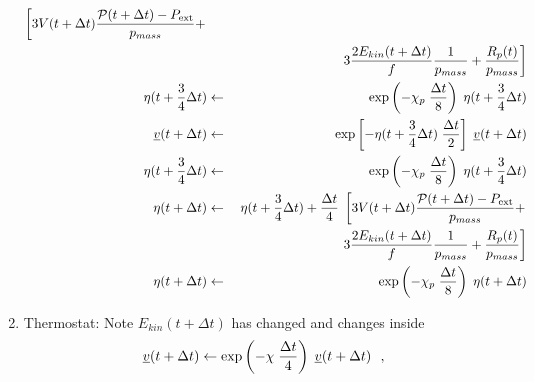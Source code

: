 \begin{enumerate}
\begin{eqnarray}
\left[ 3 V(t + \Delta t) \frac{{\cal P}(t + \Delta t) - P_{\rm ext}}{p_{mass}} + \right. \nonumber \\
&& ~~~~~~~~~~~~~~~~~~~~~~~~\left. 3 \frac{2 E_{kin}(t + \Delta t)}{f} \frac{1}{p_{mass}} + \frac{R_{p}(t)}{p_{mass}} \right] \nonumber \\
\eta (t + {3 \over 4} \Delta t) &\leftarrow& \exp \left( -\chi_{p} \; {\Delta t \over 8} \right)  \;
\eta (t + {3 \over 4} \Delta t) \nonumber \\
\mbox{$\underline{v}$}(t + \Delta t) &\leftarrow& \exp \left[ -\eta (t + {3 \over 4} \Delta t) \;
{\Delta t \over 2} \right] \; \mbox{$\underline{v}$}(t + \Delta t) \\
\eta (t + {3 \over 4} \Delta t) &\leftarrow& \exp \left( -\chi_{p} \; {\Delta t \over 8} \right)  \;
\eta (t + {3 \over 4} \Delta t) \nonumber \\
\eta (t + \Delta t) &\leftarrow& \eta (t + {3 \over 4} \Delta t) + {\Delta t \over 4} \;
\left[ 3 V(t + \Delta t) \frac{{\cal P}(t + \Delta t) - P_{\rm ext}}{p_{mass}} + \right. \nonumber \\
&& ~~~~~~~~~~~~~~~~~~~~~~~~\left. 3 \frac{2 E_{kin}(t + \Delta t)}{f} \frac{1}{p_{mass}} + \frac{R_{p}(t)}{p_{mass}} \right] \nonumber \\
\eta (t + \Delta t) &\leftarrow& \exp \left( -\chi_{p} \; {\Delta t \over 8} \right)  \;
\eta (t + \Delta t) \nonumber
\end{eqnarray}
\item Thermostat: Note $E_{kin}(t + \Delta t)$ has changed and changes inside
\begin{equation}
\mbox{$\underline{v}$}(t + \Delta t) \leftarrow \exp \left( -\chi \; {\Delta t \over 4} \right) \; \mbox{$\underline{v}$}(t + \Delta t)~~,
\end{equation}
\end{enumerate}

